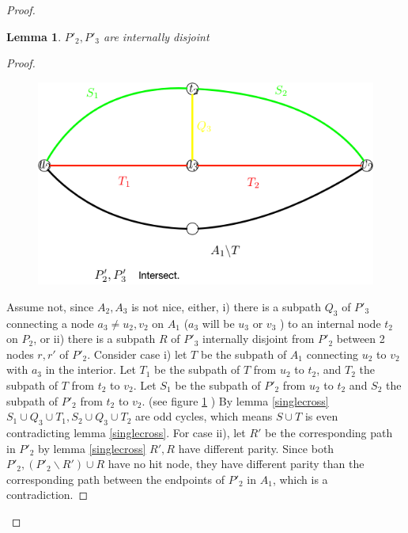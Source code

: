\documentclass[letterpaper,11pt]{article}
\newtheorem{lemma}[theorem]{Lemma}
\newcommand{\0}{\mathbb{0}}
\newcommand{\1}{\mathbb{1}}
\begin{document}
\begin{proof}

\begin{lemma}
$P'_2, P'_3$ are internally disjoint
\end{lemma}
\begin{proof}
\begin{figure}[h]
      \includegraphics[scale=0.3]{P'_2P'_3intersect.png}
       \label{P'_2P'_3inter}
\end{figure}
Assume not, since $A_2,A_3$ is not nice, either, i) there is a subpath $Q_3$ of $P'_3$ connecting a node $a_3 \neq u_2, v_2$ on $A_1$ ($a_3$  will be $u_3$ or $v_3$ ) to an internal node $t_2$ on $P_2$, or ii) there is a subpath $R$ of $P'_3$ internally disjoint from $P'_2$ between 2 nodes $r,r'$ of $P'_2$. Consider case i) let $T$ be the subpath of $A_1$ connecting $u_2$ to $v_2$ with $a_3$ in the interior. Let $T_1$ be the subpath of $T$ from $u_2$ to $t_2$, and $T_2$ the subpath of $T$ from $t_2$ to $v_2$. Let $S_1$ be the subpath of $P'_2$ from $u_2$ to $t_2$ and $S_2$ the subpath of $P'_2$ from $t_2$ to $v_2$. (see figure \ref{P'_2P'_3inter} ) By lemma \ref{singlecross}  $S_1 \cup Q_3 \cup T_1 , S_2 \cup Q_3 \cup T_2$ are odd cycles, which means $S \cup T $ is even contradicting lemma \ref{singlecross}.  For case ii), let $R'$ be the corresponding path in $P'_2$ by lemma \ref{singlecross} $R',R$ have different parity. Since both $P'_2 , (P'_2 \backslash R' ) \cup R $ have no hit node, they have different parity than the corresponding path between the endpoints of $P'_2$ in $A_1$, which is a contradiction.
\end{proof}


\end{proof}
\end{document}
